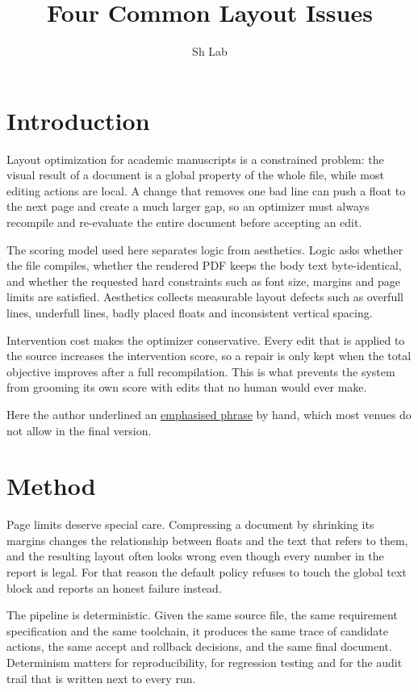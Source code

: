 \documentclass[10pt,a4paper]{article}
\title{Four Common Layout Issues}
\author{Sh Lab}
\date{}
\begin{document}
\maketitle
\section{Introduction}
Layout optimization for academic manuscripts is a constrained problem: the visual result of a document is a global property of the whole file, while most editing actions are local. A change that removes one bad line can push a float to the next page and create a much larger gap, so an optimizer must always recompile and re-evaluate the entire document before accepting an edit.

The scoring model used here separates logic from aesthetics. Logic asks whether the file compiles, whether the rendered PDF keeps the body text byte-identical, and whether the requested hard constraints such as font size, margins and page limits are satisfied. Aesthetics collects measurable layout defects such as overfull lines, underfull lines, badly placed floats and inconsistent vertical spacing.

\vspace{2cm}
Intervention cost makes the optimizer conservative. Every edit that is applied to the source increases the intervention score, so a repair is only kept when the total objective improves after a full recompilation. This is what prevents the system from grooming its own score with edits that no human would ever make.

Here the author underlined an \underline{emphasised phrase} by hand,
which most venues do not allow in the final version.

\newpage

\section{Method}
Page limits deserve special care. Compressing a document by shrinking its margins changes the relationship between floats and the text that refers to them, and the resulting layout often looks wrong even though every number in the report is legal. For that reason the default policy refuses to touch the global text block and reports an honest failure instead.

The pipeline is deterministic. Given the same source file, the same requirement specification and the same toolchain, it produces the same trace of candidate actions, the same accept and rollback decisions, and the same final document. Determinism matters for reproducibility, for regression testing and for the audit trail that is written next to every run.
\end{document}

